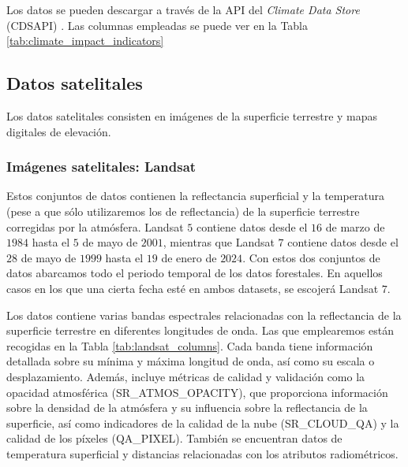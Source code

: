     Los datos se pueden descargar a través de la API del \textit{Climate Data Store} (CDSAPI) \cite{copernicus_api}. Las columnas empleadas se puede ver en la Tabla \ref{tab:climate_impact_indicators}


\subsection{Datos satelitales}
Los datos satelitales consisten en imágenes de la superficie terrestre y mapas digitales de elevación.

\subsubsection*{Imágenes satelitales: Landsat}     
    
Estos conjuntos de datos contienen la reflectancia superficial y la temperatura (pese a que sólo utilizaremos los de reflectancia) de la superficie terrestre corregidas por la atmósfera. Landsat $5$ \cite{landsat5_data} contiene datos desde el $16$ de marzo de $1984$ hasta el $5$ de mayo de $2001$, mientras que Landsat $7$ \cite{landsat7_data} contiene datos desde el $28$ de mayo de $1999$ hasta el $19$ de enero de $2024$. Con estos dos conjuntos de datos abarcamos todo el periodo temporal de los datos forestales. En aquellos casos en los que una cierta fecha esté en ambos datasets, se escojerá Landsat $7$.

\medskip

Los datos contiene varias bandas espectrales relacionadas con la reflectancia de la superficie terrestre en diferentes longitudes de onda. Las que emplearemos están recogidas en la Tabla \ref{tab:landsat_columns}. Cada banda tiene información detallada sobre su mínima y máxima longitud de onda, así como su escala o desplazamiento. Además, incluye métricas de calidad y validación como la opacidad atmosférica (SR\_ATMOS\_OPACITY), que proporciona información sobre la densidad de la atmósfera y su influencia sobre la reflectancia de la superficie, así como indicadores de la calidad de la nube (SR\_CLOUD\_QA) y la calidad de los píxeles (QA\_PIXEL). También se encuentran datos de temperatura superficial y distancias relacionadas con los atributos radiométricos.

